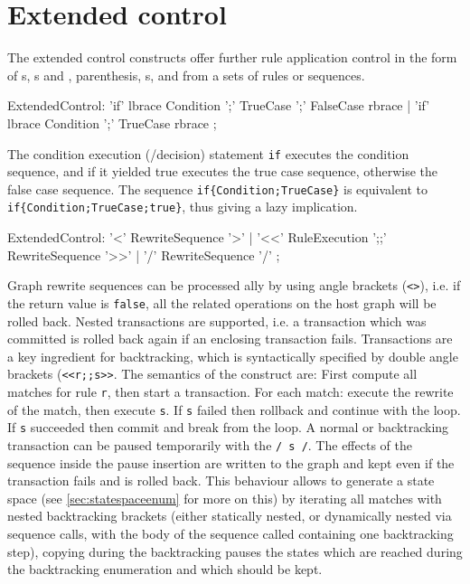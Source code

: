 \section{Extended control}

The extended control constructs offer further rule application control in the form of s, s and , parenthesis, s, and  from a sets of rules or sequences.

\begin{rail} 
  ExtendedControl: 
	'if' lbrace Condition ';' TrueCase ';' FalseCase rbrace |
	'if' lbrace Condition ';' TrueCase rbrace
	;
\end{rail}

The condition execution (/decision) statement \texttt{if} executes the condition sequence, and if it yielded true executes the true case sequence, otherwise the false case sequence.
The sequence \verb#if{Condition;TrueCase}# is equivalent to \verb#if{Condition;TrueCase;true}#, thus giving a lazy implication.

\begin{rail} 
  ExtendedControl: 
    '<' RewriteSequence '>' | 
    '<<' RuleExecution ';;' RewriteSequence '>>' |
    '/' RewriteSequence '/'
	;
\end{rail}

Graph rewrite sequences can be processed ally by using angle brackets (\texttt{<>}), i.e.
if the return value is \texttt{false}, all the related operations on the host graph will be rolled back.
Nested transactions are supported, i.e. a transaction which was committed is rolled back again if an enclosing transaction fails.
Transactions are a key ingredient for backtracking, which is syntactically specified by double angle brackets (\texttt{<<r;;s>>}.
The semantics of the construct are:
First compute all matches for rule \texttt{r}, then start a transaction.
For each match: execute the rewrite of the match, then execute \texttt{s}.
If \texttt{s} failed then rollback and continue with the loop.
If \texttt{s} succeeded then commit and break from the loop.
A normal or backtracking transaction can be paused temporarily with the  \texttt{/ s /}.
The effects of the sequence inside the pause insertion are written to the graph and kept even if the transaction fails and is rolled back.
This behaviour allows to generate a state space (see \ref{sec:statespaceenum} for more on this) by iterating all matches with nested backtracking brackets (either statically nested, or dynamically nested via sequence calls, with the body of the sequence called containing one backtracking step), copying during the backtracking pauses the states which are reached during the backtracking enumeration and which should be kept.

